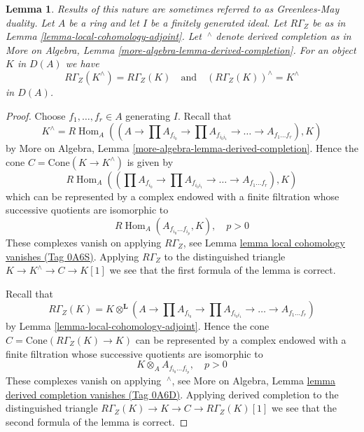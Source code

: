 \documentclass{amsart}
\newenvironment{slogan}{\comment}{\endcomment}
\theoremstyle{plain}
\newtheorem{lemma}[subsection]{Lemma}
\theoremstyle{definition}
\theoremstyle{remark}
\numberwithin{equation}{subsection}
\def\Hom{\mathop{\mathrm{Hom}}\nolimits}
\begin{document}
\begin{lemma}
\label{lemma-complete-and-local}
\begin{slogan}
Results of this nature are sometimes referred to as Greenlees-May duality.
\end{slogan}
Let $A$ be a ring and let $I$ be a finitely generated ideal.
Let $R\Gamma_Z$ be as in Lemma \ref{lemma-local-cohomology-adjoint}.
Let ${\ }^\wedge$ denote derived completion as in
More on Algebra, Lemma \ref{more-algebra-lemma-derived-completion}.
For an object $K$ in $D(A)$ we have
$$
R\Gamma_Z(K^\wedge) = R\Gamma_Z(K)
\quad\text{and}\quad
(R\Gamma_Z(K))^\wedge = K^\wedge
$$
in $D(A)$.
\end{lemma}

\begin{proof}
Choose $f_1, \ldots, f_r \in A$ generating $I$. Recall that
$$
K^\wedge = R\Hom_A\left((A \to \prod A_{f_{i_0}}
\to \prod A_{f_{i_0i_1}} \to \ldots \to A_{f_1 \ldots f_r}), K\right)
$$
by More on Algebra, Lemma \ref{more-algebra-lemma-derived-completion}.
Hence the cone $C = \text{Cone}(K \to K^\wedge)$
is given by
$$
R\Hom_A\left((\prod A_{f_{i_0}}
\to \prod A_{f_{i_0i_1}} \to \ldots \to A_{f_1 \ldots f_r}), K\right)
$$
which can be represented by a complex endowed with a finite filtration
whose successive quotients are isomorphic to
$$
R\Hom_A(A_{f_{i_0} \ldots f_{i_p}}, K), \quad p > 0
$$
These complexes vanish on applying $R\Gamma_Z$, see
Lemma \href{https://stacks.math.columbia.edu/tag/0A6S}{lemma local cohomology vanishes (Tag 0A6S)}. Applying $R\Gamma_Z$
to the distinguished triangle $K \to K^\wedge \to C \to K[1]$
we see that the first formula of the lemma is correct.

\medskip\noindent
Recall that
$$
R\Gamma_Z(K) =
K \otimes^\mathbf{L} (A \to \prod A_{f_{i_0}}
\to \prod A_{f_{i_0i_1}} \to \ldots \to A_{f_1 \ldots f_r})
$$
by Lemma \ref{lemma-local-cohomology-adjoint}.
Hence the cone $C = \text{Cone}(R\Gamma_Z(K) \to K)$
can be represented by a complex endowed with a finite filtration
whose successive quotients are isomorphic to
$$
K \otimes_A A_{f_{i_0} \ldots f_{i_p}}, \quad p > 0
$$
These complexes vanish on applying ${\ }^\wedge$, see
More on Algebra, Lemma \href{https://stacks.math.columbia.edu/tag/0A6D}{lemma derived completion vanishes (Tag 0A6D)}.
Applying derived completion to the distinguished triangle
$R\Gamma_Z(K) \to K \to C \to R\Gamma_Z(K)[1]$
we see that the second formula of the lemma is correct.
\end{proof}
\end{document}
